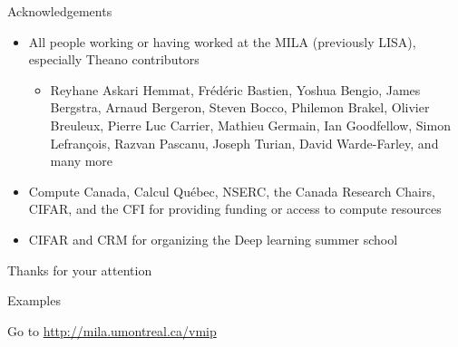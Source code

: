 \documentclass[a4paper,9pt]{beamer}
\begin{document}
\begin{frame}{Acknowledgements}
  \begin{itemize}
    \item All people working or having worked at the MILA (previously LISA), especially Theano contributors
      \begin{itemize}
        \item
          Reyhane Askari Hemmat,
          Frédéric Bastien,
          Yoshua Bengio,
          James Bergstra,
          Arnaud Bergeron,
          Steven Bocco,
          Philemon Brakel,
          Olivier Breuleux,
          Pierre Luc Carrier,
          Mathieu Germain,
          Ian Goodfellow,
          Simon Lefrançois,
          Razvan Pascanu,
          Joseph Turian,
          David Warde-Farley,
          and many more
      \end{itemize}
    \item Compute Canada, Calcul Québec, NSERC, the Canada Research Chairs, CIFAR, and the CFI for providing funding or access to compute resources
    \item CIFAR and CRM for organizing the Deep learning summer school
  \end{itemize}
\end{frame}

\begin{frame}[fragile]{Thanks for your attention}
  \vspace{.5cm}


  \vspace{.5cm}
\end{frame}

\begin{frame}[fragile]{Examples}

  Go to \url{http://mila.umontreal.ca/vmip}

\end{frame}
\end{document}
